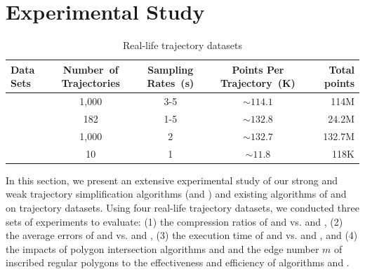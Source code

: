 \section{Experimental Study} %
\label{sec-exp}

\begin{table}[bt!]
	\caption{\small Real-life trajectory datasets}
	\vspace{-1ex}
	\centering
	\small
	\begin{tabular}{|l|c|c|c|r|}
		\hline
		\bf{ Data Sets}& \bf{Number\ of Trajectories}     &\bf {Sampling Rates\ (s)}   &\bf{Points Per Trajectory\ (K)}    &\bf {Total points} \\
		\hline
		\sercar	&1,000	    &3-5	    &$\sim114.1$   &114M\\
		\hline
		\geolife &182	    &1-5	    &$\sim132.8$   &24.2M\\
		\hline
		\mopsi	&1,000	    &2	    &$\sim132.7$     &132.7M \\
		\hline
		\pricar	& 10	    &1	        &$\sim11.8$      &118K \\
		\hline
	\end{tabular}
	\label{tab:datasets}
	\vspace{-2ex}
\end{table}


In this section, we present an extensive experimental study of our strong and weak trajectory simplification algorithms (\cist and \cista) and existing algorithms of \dps and \squishe on trajectory datasets.
Using four real-life trajectory datasets, we conducted three sets of experiments to evaluate:
(1) the compression ratios of \cist and \cista vs. \dps and \squishe,
(2) the average errors of \cist and \cista vs. \dps and \squishe,
(3) the execution time of \cist and \cista vs. \dps and \squishe, and
(4) the impacts of polygon intersection algorithms \rpia and \cpia and the edge number $m$ of inscribed regular polygons to the effectiveness and efficiency of algorithms \cist and \cista.


